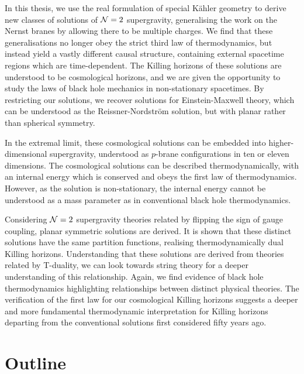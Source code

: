 In this thesis, we use the real formulation of special K\"ahler geometry to derive new classes of solutions of ${\cal N} = 2$ supergravity, generalising the work on the Nernst branes by allowing there to be multiple charges. We find that these generalisations no longer obey the strict third law of thermodynamics, but instead yield a vastly different causal structure, containing external spacetime regions which are time-dependent. The Killing horizons of these solutions are understood to be cosmological horizons, and we are given the opportunity to study the laws of black hole mechanics in non-stationary spacetimes. By restricting our solutions, we recover solutions for Einstein-Maxwell theory, which can be understood as the Reissner-Nordstr\"om solution, but with planar rather than spherical symmetry. 

In the extremal limit, these cosmological solutions can be embedded into higher-dimensional supergravity, understood as $p$-brane configurations in ten or eleven dimensions. The cosmological solutions can be described thermodynamically, with an internal energy which is conserved and obeys the first law of thermodynamics. However, as the solution is non-stationary, the internal energy cannot be understood as a mass parameter as in conventional black hole thermodynamics. 

Considering ${\cal N} = 2$ supergravity theories related by flipping the sign of gauge coupling, planar symmetric solutions are derived. It is shown that these distinct solutions have the same partition functions, realising thermodynamically dual Killing horizons. Understanding that these solutions are derived from theories related by T-duality, we can look towards string theory for a deeper understanding of this relationship. Again, we find evidence of black hole thermodynamics highlighting relationships between distinct physical theories. The verification of the first law for our cosmological Killing horizons suggests a deeper and more fundamental thermodynamic interpretation for Killing horizons departing from the conventional solutions first considered fifty years ago. 

\section{Outline}

